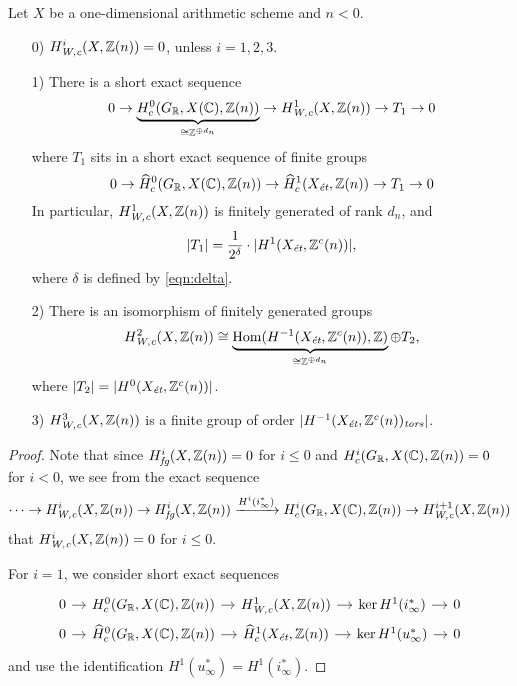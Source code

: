 \documentclass{article}
\numberwithin{equation}{section}
\begin{document}
\begin{proposition}
  \label{prop:calculation-of-H-Wc}
  Let $X$ be a one-dimensional arithmetic scheme and $n < 0$.

  \begin{enumerate}
  \item[0)] $H^i_\Wc (X, \ZZ(n)) = 0$, unless $i = 1,2,3$.

  \item[1)] There is a short exact sequence
    \[ 0 \to \underbrace{H^0_c (G_\RR, X (\CC), \ZZ(n))}_{\cong \ZZ^{\oplus d_n}} \to H^1_\Wc (X, \ZZ(n)) \to T_1 \to 0 \]
    where $T_1$ sits in a short exact sequence of finite groups
    \[ 0 \to \widehat{H}^0_c (G_\RR, X(\CC), \ZZ(n)) \to
      \widehat{H}^1_c (X_\et, \ZZ(n)) \to
      T_1 \to 0 \]
    In particular, $H^1_\Wc (X, \ZZ(n))$ is finitely generated of rank $d_n$,
    and
    $$|T_1| = \frac{1}{2^\delta}\cdot |H^1 (X_\et, \ZZ^c (n))|,$$
    where $\delta$ is defined by \eqref{eqn:delta}.

  \item[2)] There is an isomorphism of finitely generated groups
    \[ H^2_\Wc (X, \ZZ(n)) \cong
      \underbrace{\Hom (H^{-1} (X_\et, \ZZ^c(n)), \ZZ)}_{\cong \ZZ^{\oplus d_n}}
      \oplus
      T_2, \]
    where $|T_2| = |H^0 (X_\et, \ZZ^c(n))|$.

  \item[3)] $H^3_\Wc (X, \ZZ(n))$ is a finite group of order
    $|H^{-1} (X_\et, \ZZ^c(n))_\tors|$.
  \end{enumerate}

  \begin{proof}
    Note that since $H^i_\fg (X,\ZZ(n)) = 0$ for $i \le 0$ and
    $H^i_c (G_\RR, X(\CC), \ZZ(n)) = 0$ for $i < 0$, we see from the exact
    sequence
    \[ \cdots \to H^i_\Wc (X, \ZZ(n)) \to
      H^i_\fg (X,\ZZ(n)) \xrightarrow{H^i (i^*_\infty)}
      H^i_c (G_\RR, X(\CC), \ZZ(n)) \to
      H^{i+1}_\Wc (X, \ZZ(n)) \]
    that $H^i_\Wc (X, \ZZ(n)) = 0$ for $i \le 0$.

    \vspace{1em}

    For $i = 1$, we consider short exact sequences
    \[ \begin{tikzcd}[column sep=1em,row sep=0pt]
        0 \ar{r} & H^0_c (G_\RR, X(\CC), \ZZ(n)) \ar{r} & H^1_\Wc (X, \ZZ(n)) \ar{r} & \ker H^1 (i^*_\infty) \ar{r} & 0 \\
        0 \ar{r} & \widehat{H}^0_c (G_\RR, X(\CC), \ZZ(n)) \ar{r} & \widehat{H}^1_c (X_\et, \ZZ(n)) \ar{r} & \ker H^1 (u_\infty^*) \ar{r} & 0
      \end{tikzcd} \]
    and use the identification $H^1 (u^*_\infty) = H^1 (i^*_\infty)$.


\end{proof}
\end{proposition}
\end{document}
